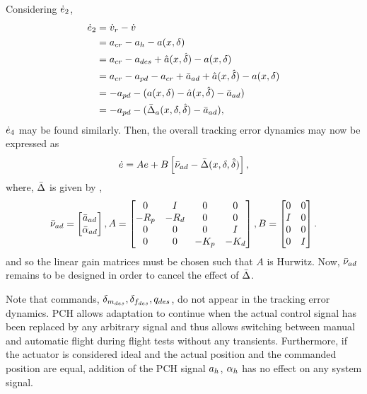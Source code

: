 %
Considering $\dot{e}_2$,
%
\[
\begin{split}
\dot{e}_2 &= \dot{v}_{r} - \dot{v} \\
          &= a_{cr} - a_{h} - a(x,\delta) \\
          &= a_{cr} -a_{des} + \hat{a}(x,\hat{\delta}) - a(x,\delta) \\
          &= a_{cr} -a_{pd} -a_{cr} + \bar{a}_{ad} + \hat{a}(x,\hat{\delta}) - a(x,\delta)\\
          &= -a_{pd} - (a(x,\delta) - \hat{a}(x,\hat{\delta}) - \bar{a}_{ad}) \\
          &= -a_{pd} - (\bar{\Delta}_a(x,\delta,\hat{\delta}) - \bar{a}_{ad}), \\
\end{split}
\]
%
$\dot{e}_4$ may be found similarly. Then, the overall tracking
error dynamics may now be expressed as
%
\begin{equation}\label{e:edot}
\dot{e} = Ae + B\left[ \bar{\nu}_{ad} -
\bar{\Delta}(x,\delta,\hat{\delta})\right],
\end{equation} where, $\bar{\Delta}$ is given by ,
\begin{equation}
 \bar{\nu}_{ad} = \begin{bmatrix}\bar{a}_{ad} \\ \bar{\alpha}_{ad}
\end{bmatrix},
\label{e:AB} A =
\begin{bmatrix}
0     &    I     &    0    &   0 \\
-R_p  &   -R_d   &    0    &   0 \\
0     &    0     &    0    &   I \\
0     &    0     &   -K_p  & -K_d
\end{bmatrix},
B =
\begin{bmatrix}
0   &   0 \\
I   &   0 \\
0   &   0 \\
0   &   I
\end{bmatrix}.
\end{equation}
%
and so the linear gain matrices must be chosen such that $A$ is
Hurwitz. Now, $\bar{\nu}_{ad}$ remains to be designed in order to cancel
the effect of $\bar{\Delta}$.


Note that commands, $\delta_{m_{des}},\delta_{f_{des}},q_{des}$, do not appear in
the tracking error dynamics. PCH allows adaptation to continue when
the actual control signal has been replaced by any arbitrary signal
and thus allows switching between manual and automatic flight during
flight tests without any transients. Furthermore, if the actuator is considered ideal and the actual
position and the commanded position are equal, addition of the PCH
signal $a_{h}$, $\alpha_{h}$ has no effect on any system signal.

